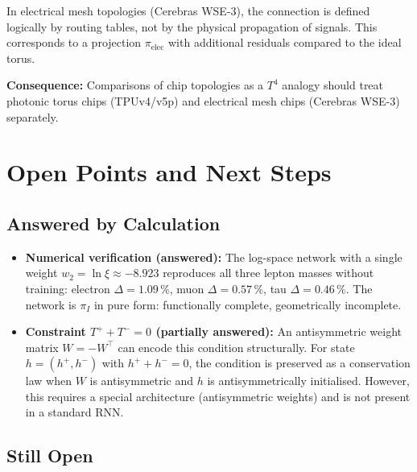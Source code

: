 In electrical mesh topologies (Cerebras WSE-3), the connection is defined
logically by routing tables, not by the physical propagation of signals.
This corresponds to a projection $\pi_\text{elec}$ with additional
residuals compared to the ideal torus.

\textbf{Consequence:} Comparisons of chip topologies as a $T^4$ analogy
should treat photonic torus chips (TPUv4/v5p) and electrical mesh chips
(Cerebras WSE-3) separately.


\section{Open Points and Next Steps}

\subsection*{Answered by Calculation}

\begin{itemize}
  \item \textbf{Numerical verification (answered):}
        The log-space network with a single weight $w_2 = \ln\xi \approx -8.923$
        reproduces all three lepton masses without training:
        electron $\Delta=1.09\,\%$, muon $\Delta=0.57\,\%$, tau $\Delta=0.46\,\%$.
        The network is $\pi_I$ in pure form: functionally complete, geometrically incomplete.

  \item \textbf{Constraint $T^+ + T^- = 0$ (partially answered):}
        An antisymmetric weight matrix $W = -W^\top$ can encode this condition
        structurally. For state $h = (h^+, h^-)$ with $h^+ + h^- = 0$,
        the condition is preserved as a conservation law when $W$ is antisymmetric
        and $h$ is antisymmetrically initialised. However, this requires a special
        architecture (antisymmetric weights) and is not present in a standard RNN.
\end{itemize}

\subsection*{Still Open}


